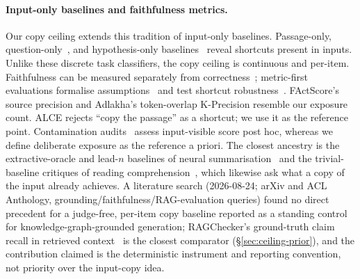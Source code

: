\documentclass[10pt,twocolumn]{article}
\begin{document}
\paragraph{Input-only baselines and faithfulness metrics.}
Our copy ceiling extends this tradition of input-only baselines. Passage-only, question-only~\cite{kaushik2018reading}, and hypothesis-only baselines~\cite{gururangan2018artifacts,poliak2018hypothesis} reveal shortcuts present in inputs. Unlike these discrete task classifiers, the copy ceiling is continuous and per-item. Faithfulness can be measured separately from correctness~\cite{es2023ragas,adlakha2024evaluating,zhou2023contextfaithful}; metric-first evaluations formalise assumptions~\cite{min2023factscore} and test shortcut robustness~\cite{gao2023alce}. FActScore's source precision and Adlakha's token-overlap K-Precision resemble our exposure count. ALCE rejects ``copy the passage'' as a shortcut; we use it as the reference point. Contamination audits~\cite{sainz2023contamination,golchin2024timetravel} assess input-visible score post hoc, whereas we define deliberate exposure as the reference a priori. The closest ancestry is the extractive-oracle and lead-$n$ baselines of neural summarisation~\cite{see2017pointergenerator,narayan2018xsum} and the trivial-baseline critiques of reading comprehension~\cite{kaushik2018reading}, which likewise ask what a copy of the input already achieves. A literature search (2026-08-24; arXiv and ACL Anthology, grounding/faithfulness/RAG-evaluation queries) found no direct precedent for a judge-free, per-item copy baseline reported as a standing control for knowledge-graph-grounded generation; RAGChecker's ground-truth claim recall in retrieved context~\cite{ragchecker2024} is the closest comparator (\S\ref{sec:ceiling-prior}), and the contribution claimed is the deterministic instrument and reporting convention, not priority over the input-copy idea.
\end{document}
